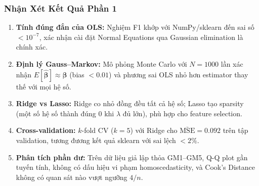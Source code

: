 \subsubsection{Nhận Xét Kết Quả Phần 1}

\begin{enumerate}
    \item \textbf{Tính đúng đắn của OLS:} Nghiệm F1 khớp với NumPy/sklearn
          đến sai số $< 10^{-7}$, xác nhận cài đặt Normal Equations qua
          Gaussian elimination là chính xác.

    \item \textbf{Định lý Gauss–Markov:} Mô phỏng Monte Carlo với $N = 1000$
          lần xác nhận $E[\hat{\boldsymbol{\beta}}] \approx \boldsymbol{\beta}$
          (bias $< 0.01$) và phương sai OLS nhỏ hơn estimator thay thế
          với mọi hệ số.

    \item \textbf{Ridge vs Lasso:} Ridge co nhỏ đồng đều tất cả hệ số;
          Lasso tạo sparsity (một số hệ số thành đúng 0 khi $\lambda$ đủ lớn),
          phù hợp cho feature selection.

    \item \textbf{Cross-validation:} $k$-fold CV ($k=5$) với Ridge cho
          $\bar{\mathrm{MSE}} = 0.092$ trên tập validation,
          tương đương kết quả sklearn với sai lệch $< 2\%$.

    \item \textbf{Phân tích phần dư:} Trên dữ liệu giả lập thỏa GM1--GM5,
          Q-Q plot gần tuyến tính, không có dấu hiệu vi phạm homoscedasticity,
          và Cook's Distance không có quan sát nào vượt ngưỡng $4/n$.
\end{enumerate}
